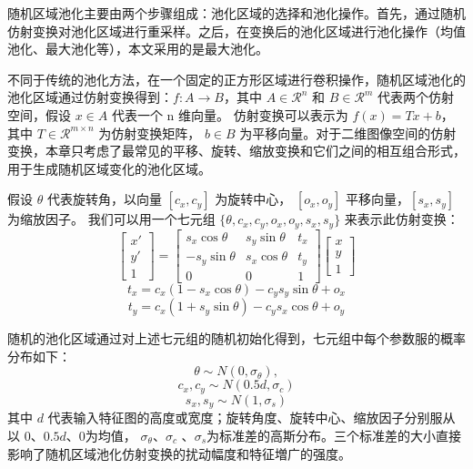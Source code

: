 随机区域池化主要由两个步骤组成：池化区域的选择和池化操作。首先，通过随机仿射变换对池化区域进行重采样。之后，在变换后的池化区域进行池化操作（均值池化、最大池化等），本文采用的是最大池化。

不同于传统的池化方法，在一个固定的正方形区域进行卷积操作，随机区域池化的池化区域通过仿射变换得到：$f : A {\rightarrow} B$，其中 $A {\in} \mathcal{R}^n$ 和 $B {\in} \mathcal{R}^m$ 代表两个仿射空间，假设 $x {\in} A$  代表一个 n 维向量。 仿射变换可以表示为 $f(x) = Tx + b$，其中 $T {\in} \mathcal{R}^{m \times n}$ 为仿射变换矩阵， $b {\in} B$ 为平移向量。对于二维图像空间的仿射变换，本章只考虑了最常见的平移、旋转、缩放变换和它们之间的相互组合形式，用于生成随机区域变化的池化区域。

假设 $\theta$ 代表旋转角，以向量 $[c_x, c_y]$ 为旋转中心， $[o_x, o_y]$ 平移向量，$[s_x, s_y]$ 为缩放因子。 我们可以用一个七元组 $\{\theta, c_x, c_y, o_x, o_y, s_x, s_y\}$ 来表示此仿射变换：
\begin{equation}  \label{equ:all}
  \left[
  \begin{array}{c}
          x' \\
          y' \\
          1
 \end{array}
 \right]
 =
  \left[
  \begin{array}{ccc}
          s_x \cos{\theta} & s_y \sin{\theta} & t_x\\
          -s_y \sin{\theta} & s_x \cos{\theta} & t_y\\
          0 & 0 & 1
  \end{array}
  \right]
  \left[
  \begin{array}{c}
          x \\
          y \\
          1
  \end{array}
  \right]
\end{equation}
\begin{equation} \label{equ:tx}
t_x = c_x (1 - s_x \cos{\theta}) - c_y s_y \sin{\theta} + o_x
\end{equation}
\begin{equation} \label{equ:ty}
t_y = c_x (1 + s_y \sin{\theta}) - c_y s_x \cos{\theta} + o_y
\end{equation}

随机的池化区域通过对上述七元组的随机初始化得到，七元组中每个参数服的概率分布如下：
\begin{equation} \label{equ:theta}
\theta \sim N(0, \sigma_{\theta}), 
\end{equation}
\begin{equation} \label{equ:cx}
c_x, c_y \sim N(0.5d, \sigma_{c})
\end{equation}
\begin{equation} \label{equ:sx}
s_x, s_y \sim N(1, \sigma_{s})
\end{equation}
其中 $d$ 代表输入特征图的高度或宽度；旋转角度、旋转中心、缩放因子分别服从以 0、$0.5d$、0为均值，
$\sigma_{\theta}$、$\sigma_c$ 、$\sigma_s$为标准差的高斯分布。三个标准差的大小直接影响了随机区域池化仿射变换的扰动幅度和特征増广的强度。

